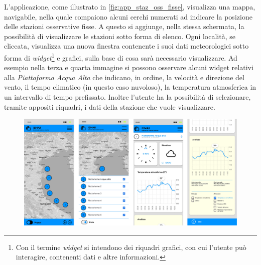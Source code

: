 \documentclass[./main.tex]{subfiles}
\begin{document}
L'applicazione, come illustrato in \autoref{fig:app_staz_oss_fisse}, visualizza una mappa, navigabile, nella quale compaiono alcuni cerchi numerati ad indicare la posizione delle stazioni osservative fisse. A questo si aggiunge, nella stessa schermata, la possibilità di visualizzare le stazioni sotto forma di elenco. Ogni località, se cliccata, visualizza una nuova finestra contenente i suoi dati meteorologici sotto forma di \textit{widget}\footnote{Con il termine \textit{widget} si intendono dei riquadri grafici, con cui l'utente può interagire, contenenti dati e altre informazioni.} e grafici, sulla base di cosa sarà necessario visualizzare. Ad esempio nella terza e quarta immagine si possono osservare alcuni widget relativi alla \textit{Piattaforma Acqua Alta} che indicano, in ordine, la velocità e direzione del vento, il tempo climatico (in questo caso nuvoloso), la temperatura atmosferica in un intervallo di tempo prefissato. Inoltre l'utente ha la possibilità di selezionare, tramite appositi riquadri, i dati della stazione che vuole visualizzare.

\begin{figure}[!ht]
\noindent\begin{minipage}{\textwidth}
\vspace{1cm}
\includegraphics[width=\textwidth]{images/app_ismar_data_staz_oss_fisse.pdf}
\captionsetup{font=small, hypcap=false}
\label{fig:app_staz_oss_fisse}
\end{minipage}
\vspace{0.25cm}
\end{figure}
\end{document}
